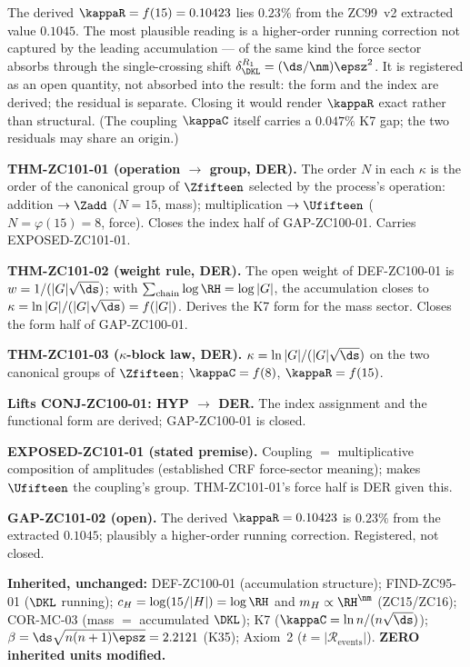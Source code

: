 \documentclass[12pt, a4paper]{article}
\begin{document}
\begin{openqbox}[title={GAP-ZC101-02: The $0.23\%$ residual}]
The derived $\kappaR=f(15)=0.10423$ lies $0.23\%$ from the ZC99~v2 extracted
value $0.1045$. The most plausible reading is a higher-order running correction
not captured by the leading accumulation --- of the same kind the force sector
absorbs through the single-crossing shift
$\delta_{\DKL}^{R_1}=(\ds/\nm)\epsz^2$. It is registered as an open quantity,
not absorbed into the result: the form and the index are derived; the residual
is separate. Closing it would render $\kappaR$ exact rather than structural.
(The coupling $\kappaC$ itself carries a $0.047\%$ K7 gap; the two residuals may
share an origin.)
\end{openqbox}

\begin{formalbox}[title={Atomic Registry --- ZC101}]
\textbf{THM-ZC101-01 (operation $\to$ group, DER).} The order $N$ in each
$\kappa$ is the order of the canonical group of $\Zfifteen$ selected by the
process's operation: addition $\to\Zadd$ ($N=15$, mass); multiplication
$\to\Ufifteen$ ($N=\varphi(15)=8$, force). Closes the index half of
GAP-ZC100-01. Carries EXPOSED-ZC101-01.

\smallskip
\textbf{THM-ZC101-02 (weight rule, DER).} The open weight of DEF-ZC100-01 is
$w=1/(|G|\sqrt{\ds})$; with $\sum_{\text{chain}}\log\RH=\log|G|$, the
accumulation closes to $\kappa=\ln|G|/(|G|\sqrt{\ds})=f(|G|)$. Derives the K7
form for the mass sector. Closes the form half of GAP-ZC100-01.

\smallskip
\textbf{THM-ZC101-03 ($\kappa$-block law, DER).} $\kappa=\ln|G|/(|G|\sqrt{\ds})$
on the two canonical groups of $\Zfifteen$; $\kappaC=f(8)$, $\kappaR=f(15)$.

\smallskip
\textbf{Lifts CONJ-ZC100-01: HYP $\to$ DER.} The index assignment and the
functional form are derived; GAP-ZC100-01 is closed.

\smallskip
\textbf{EXPOSED-ZC101-01 (stated premise).} Coupling $=$ multiplicative
composition of amplitudes (established CRF force-sector meaning); makes
$\Ufifteen$ the coupling's group. THM-ZC101-01's force half is DER given this.

\smallskip
\textbf{GAP-ZC101-02 (open).} The derived $\kappaR=0.10423$ is $0.23\%$ from the
extracted $0.1045$; plausibly a higher-order running correction. Registered,
not closed.

\smallskip
\textbf{Inherited, unchanged:} DEF-ZC100-01 (accumulation structure);
FIND-ZC95-01 ($\DKL$ running); $c_H=\log(15/|H|)=\log\RH$ and
$m_H\propto\RH^{\nm}$ (ZC15/ZC16); COR-MC-03 (mass $=$ accumulated $\DKL$); K7
($\kappaC=\ln n/(n\sqrt{\ds})$); $\beta=\ds\sqrt{n(n+1)\epsz}=2.2121$ (K35);
Axiom~2 ($t=|\mathcal{R}_{\mathrm{events}}|$). \textbf{ZERO inherited units
modified.}
\end{formalbox}
\end{document}
